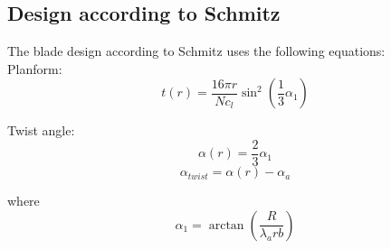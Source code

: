 \documentclass[10pt]{article}
\begin{document}
\subsection{Design according to Schmitz}
The blade design according to Schmitz uses the following equations:\\
Planform:
\begin{equation}
t(r) = \frac{16\pi r}{N c_l}\sin^2(\frac{1}{3}\alpha_1)
\end{equation}

Twist angle:
\begin{equation}
\alpha(r) = \frac{2}{3}\alpha_1
\end{equation}
\begin{equation}
\alpha_{twist} = \alpha(r) - \alpha_a
\end{equation}

where
\begin{equation}
\alpha_1 = \arctan(\frac{R}{\lambda_a rb})
\end{equation}
\end{document}
